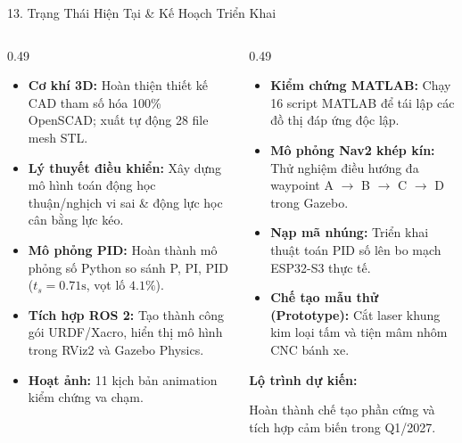\documentclass[aspectratio=169,9pt]{beamer}
\newcommand{\smallnote}[1]{{\fontsize{7.1}{8.4}\selectfont #1\par}}
\newcommand{\tinytext}[1]{{\fontsize{6.3}{7.3}\selectfont #1\par}}
\newcommand{\heading}[1]{{\bfseries\color{PTITRed} #1\par}}
\newcommand{\tightitems}{\setlength{\itemsep}{0.13em}\setlength{\parskip}{0pt}\setlength{\parsep}{0pt}}
\begin{document}
\begin{frame}{13. Trạng Thái Hiện Tại \& Kế Hoạch Triển Khai}
  \vspace{0.02cm}
  \begin{columns}[T,onlytextwidth]
    \begin{column}{0.49\textwidth}
      \begin{tcolorbox}[titlepanel,title=Kết quả đã hoàn thành (Completed)]
        \begin{itemize}\tightitems
          \item \smallnote{\textbf{Cơ khí 3D:} Hoàn thiện thiết kế CAD tham số hóa 100\% OpenSCAD; xuất tự động 28 file mesh STL.}
          \item \smallnote{\textbf{Lý thuyết điều khiển:} Xây dựng mô hình toán động học thuận/nghịch vi sai \& động lực học cân bằng lực kéo.}
          \item \smallnote{\textbf{Mô phỏng PID:} Hoàn thành mô phỏng số Python so sánh P, PI, PID ($t_s = 0.71\text{s}$, vọt lố $4.1\%$).}
          \item \smallnote{\textbf{Tích hợp ROS 2:} Tạo thành công gói URDF/Xacro, hiển thị mô hình trong RViz2 và Gazebo Physics.}
          \item \smallnote{\textbf{Hoạt ảnh:} 11 kịch bản animation kiểm chứng va chạm.}
        \end{itemize}
      \end{tcolorbox}
    \end{column}

    \begin{column}{0.49\textwidth}
      \begin{tcolorbox}[titlepanel,title=Kế hoạch triển khai tiếp theo (Next Steps)]
        \begin{itemize}\tightitems
          \item \smallnote{\textbf{Kiểm chứng MATLAB:} Chạy 16 script MATLAB để tái lập các đồ thị đáp ứng độc lập.}
          \item \smallnote{\textbf{Mô phỏng Nav2 khép kín:} Thử nghiệm điều hướng đa waypoint A $\rightarrow$ B $\rightarrow$ C $\rightarrow$ D trong Gazebo.}
          \item \smallnote{\textbf{Nạp mã nhúng:} Triển khai thuật toán PID số lên bo mạch ESP32-S3 thực tế.}
          \item \smallnote{\textbf{Chế tạo mẫu thử (Prototype):} Cắt laser khung kim loại tấm và tiện mâm nhôm CNC bánh xe.}
        \end{itemize}
        \vspace{0.06cm}
        \heading{Lộ trình dự kiến:}
        \tinytext{Hoàn thành chế tạo phần cứng và tích hợp cảm biến trong Q1/2027.}
      \end{tcolorbox}
    \end{column}
  \end{columns}
\end{frame}
\end{document}
